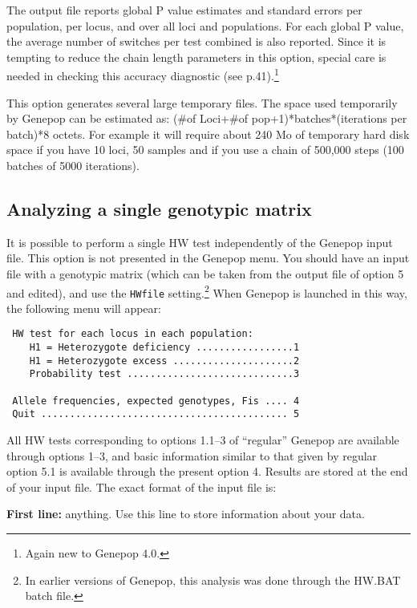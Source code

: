 \documentclass[12pt,]{book}
\let\rmarkdownfootnote\footnote%
\def\footnote{\protect\rmarkdownfootnote}
\theoremstyle{definition}
\theoremstyle{definition}
\theoremstyle{definition}
\theoremstyle{remark}
\begin{document}
The output file reports global P value estimates and standard errors per
population, per locus, and over all loci and populations. For each
global P value, the average number of switches per test combined is also
reported. Since it is tempting to reduce the chain length parameters in
this option, special care is needed in checking this accuracy diagnostic
(see p.41).\footnote{Again new to Genepop 4.0.}

This option generates several large temporary files. The space used
temporarily by Genepop can be estimated as: (\#of Loci+\#of
pop+1)*batches*(iterations per batch)*8 octets. For example it will
require about 240 Mo of temporary hard disk space if you have 10 loci,
50 samples and if you use a chain of 500,000 steps (100 batches of 5000
iterations).

\subsection{Analyzing a single genotypic
matrix}\label{analyzing-a-single-genotypic-matrix}

 It is possible to perform a
single HW test independently of the Genepop input file. This option is
not presented in the Genepop menu. You should have an input file with a
genotypic matrix (which can be taken from the output file of option 5
and edited), and use the \texttt{HWfile}
setting.\footnote{In earlier versions of Genepop, this
  analysis was done through the HW.BAT batch file.} When Genepop is
launched in this way, the following menu will appear:

\begin{verbatim}
 HW test for each locus in each population:
    H1 = Heterozygote deficiency .................1
    H1 = Heterozygote excess .....................2
    Probability test .............................3

 Allele frequencies, expected genotypes, Fis .... 4
 Quit ........................................... 5
\end{verbatim}

All HW tests corresponding to options 1.1--3 of ``regular'' Genepop are
available through options 1--3, and basic information similar to that
given by regular option 5.1 is available through the present option 4.
Results are stored at the end of your input file. The exact format of
the input file is:

\textbf{First line:} anything. Use this line to store information about
your data.
\end{document}

